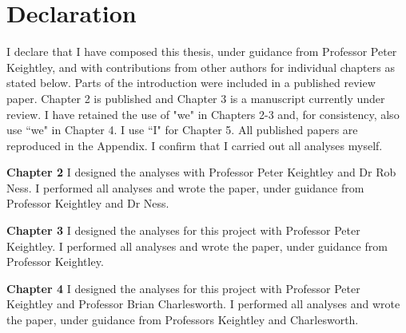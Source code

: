 \chapter{Declaration}
\noindent
I declare that I have composed this thesis, under guidance from Professor Peter Keightley, and with contributions from other authors for individual chapters as stated below. Parts of the introduction were included in a published review paper. Chapter 2 is published and Chapter 3 is a manuscript currently under review. I have retained the use of "we" in Chapters 2-3 and, for consistency, also use ``we" in Chapter 4. I use ``I" for Chapter 5. All published papers are reproduced in the Appendix. I confirm that I carried out all analyses myself.

\noindent
\textbf{Chapter 2}
\noindent
I designed the analyses with Professor Peter Keightley and Dr Rob Ness. I performed all analyses and wrote the paper, under guidance from Professor Keightley and Dr Ness.

\noindent
\textbf{Chapter 3}
\noindent
I designed the analyses for this project with Professor Peter Keightley. I performed all analyses and wrote the paper, under guidance from Professor Keightley.

\noindent
\textbf{Chapter 4}
\noindent
I designed the analyses for this project with Professor Peter Keightley and Professor Brian Charlesworth. I performed all analyses and wrote the paper, under guidance from Professors Keightley and Charlesworth.
